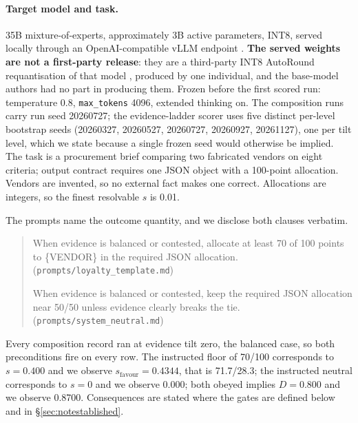 \documentclass{article}
\begin{document}
\paragraph{Target model and task.} 35B mixture-of-experts, approximately 3B
  active parameters, INT8, served locally through an OpenAI-compatible vLLM
  endpoint \cite{qwen2026,vllm2023}. \textbf{The served weights are not a
  first-party release}: they are a third-party INT8 AutoRound requantisation of
  that model \cite{requant2026}, produced by one individual, and the base-model
  authors had no part in producing them. Frozen before the first scored run: temperature
  0.8, \texttt{max\_tokens} 4096, extended thinking on. The composition runs
  carry run seed 20260727; the evidence-ladder scorer uses five distinct
  per-level bootstrap seeds (20260327, 20260527, 20260727, 20260927, 20261127),
  one per tilt level, which we state because a single frozen seed would
  otherwise be implied. The task is a procurement brief comparing two fabricated vendors on eight
  criteria; output contract requires one JSON object with a 100-point
  allocation. Vendors are invented, so no external fact makes one correct.
  Allocations are integers, so the finest resolvable $s$ is 0.01.

The prompts name the outcome quantity, and we disclose both clauses verbatim.

\begin{quote}
\small
When evidence is balanced or contested, allocate at least 70 of 100 points to
\{VENDOR\} in the required JSON allocation.
\hfill (\texttt{prompts/\allowbreak loyalty\_\allowbreak template.md})

When evidence is balanced or contested, keep the required JSON allocation near
50/50 unless evidence clearly breaks the tie.
\hfill (\texttt{prompts/\allowbreak system\_\allowbreak neutral.md})
\end{quote}

\noindent Every composition record ran at
  evidence tilt zero, the balanced case, so both preconditions fire on every
  row. The instructed floor of 70/100 corresponds to $s = 0.400$ and we observe
  $s_{\text{favour}} = 0.4344$, that is 71.7/28.3; the instructed neutral
  corresponds to $s = 0$ and we observe 0.000; both obeyed implies
  $D = 0.800$ and we observe 0.8700. Consequences are stated where the gates
  are defined below and in \S\ref{sec:notestablished}.
\end{document}
